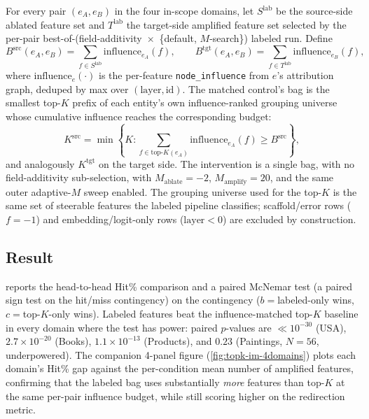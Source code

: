 For every pair $(e_A, e_B)$ in the four in-scope domains, let $S^{\mathrm{lab}}$ be the source-side ablated feature set and $T^{\mathrm{lab}}$ the target-side amplified feature set selected by the per-pair best-of-(field-additivity~$\times$~\{default, $M$-search\}) labeled run. Define
\[
B^{\mathrm{src}}(e_A, e_B) = \sum_{f \in S^{\mathrm{lab}}} \mathrm{influence}_{e_A}(f),
\qquad
B^{\mathrm{tgt}}(e_A, e_B) = \sum_{f \in T^{\mathrm{lab}}} \mathrm{influence}_{e_B}(f),
\]
where $\mathrm{influence}_{e}(\cdot)$ is the per-feature \texttt{node\_influence} from $e$'s attribution graph, deduped by max over $(\text{layer}, \text{id})$. The matched control's bag is the smallest top-$K$ prefix of each entity's own influence-ranked grouping universe whose cumulative influence reaches the corresponding budget:
\[
K^{\mathrm{src}} = \min\!\left\{K : \sum_{f \in \text{top-}K(e_A)} \mathrm{influence}_{e_A}(f) \geq B^{\mathrm{src}}\right\},
\]
and analogously $K^{\mathrm{tgt}}$ on the target side. The intervention is a single bag, with no field-additivity sub-selection, with $M_{\mathrm{ablate}}{=}-2$, $M_{\mathrm{amplify}}{=}20$, and the same outer adaptive-$M$ sweep enabled. The grouping universe used for the top-$K$ is the  same set of steerable features the labeled pipeline classifies; scaffold/error rows ($f{=}-1$) and embedding/logit-only rows ($\text{layer}{<}0$) are excluded by construction. 

\subsection{Result}

 reports the head-to-head Hit\% comparison and a paired McNemar test (a paired sign test on the hit/miss contingency) on the contingency ($b{=}{}$labeled-only wins, $c{=}{}$top-$K$-only wins). Labeled features beat the influence-matched top-$K$ baseline in every domain where the test has power: paired $p$-values are $\ll 10^{-30}$ (USA), $2.7\!\times\!10^{-20}$ (Books), $1.1\!\times\!10^{-13}$ (Products), and $0.23$ (Paintings, $N{=}56$, underpowered). The companion 4-panel figure (\cref{fig:topk-im-4domains}) plots each domain's Hit\% gap against the per-condition mean number of amplified features, confirming that the labeled bag uses substantially \emph{more} features than top-$K$ at the same per-pair influence budget, while still scoring higher on the redirection metric.

